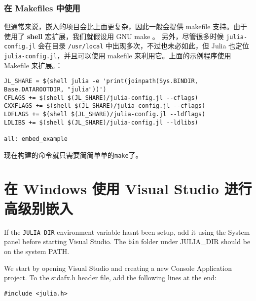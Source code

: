 \hypertarget{9935040774481087943}{}


\subsubsection{在 Makefiles 中使用}



但通常来说，嵌入的项目会比上面更复杂，因此一般会提供 makefile 支持。由于使用了 \textbf{shell} 宏扩展，我们就假设用 GNU make 。 另外，尽管很多时候 \texttt{julia-config.jl} 会在目录 \texttt{/usr/local} 中出现多次，不过也未必如此，但 Julia 也定位 \texttt{julia-config.jl}，并且可以使用 makefile 来利用它。上面的示例程序使用 Makefile 来扩展。：




\begin{lstlisting}
JL_SHARE = $(shell julia -e 'print(joinpath(Sys.BINDIR, Base.DATAROOTDIR, "julia"))')
CFLAGS += $(shell $(JL_SHARE)/julia-config.jl --cflags)
CXXFLAGS += $(shell $(JL_SHARE)/julia-config.jl --cflags)
LDFLAGS += $(shell $(JL_SHARE)/julia-config.jl --ldflags)
LDLIBS += $(shell $(JL_SHARE)/julia-config.jl --ldlibs)

all: embed_example
\end{lstlisting}



现在构建的命令就只需要简简单单的\texttt{make}了。



\hypertarget{9091699375369199363}{}


\section{在 Windows 使用 Visual Studio 进行高级别嵌入}



If the \texttt{JULIA\_DIR} environment variable hasn{\textquotesingle}t been setup, add it using the System panel before starting Visual Studio. The \texttt{bin} folder under JULIA\_DIR should be on the system PATH.



We start by opening Visual Studio and creating a new Console Application project. To the {\textquotesingle}stdafx.h{\textquotesingle} header file, add the following lines at the end:




\begin{lstlisting}
#include <julia.h>
\end{lstlisting}



